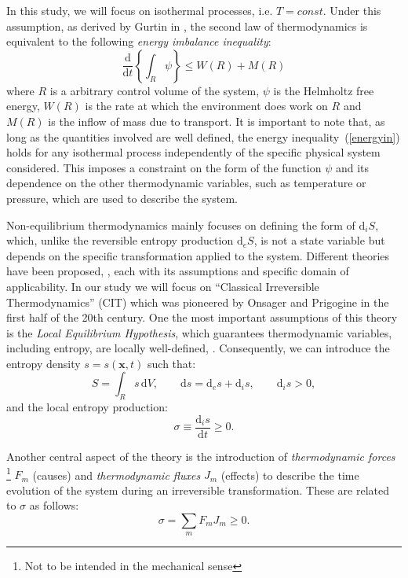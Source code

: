 \documentclass[runningheads]{llncs}
\renewcommand{\d}{\ensuremath{\text{d}}}
\begin{document}
In this study, we will focus on isothermal processes, i.e. $T=const$. Under this assumption, as derived by Gurtin in \cite{GURTIN}, the second law of thermodynamics is equivalent to the following \textit{energy imbalance inequality}:
\begin{equation}
\frac{\d}{\d t} \left\{\int_R \psi \right\}\leq W(R) + M(R) \label{energyin}
\end{equation}
where $R$ is a arbitrary control volume of the system, $\psi$ is the Helmholtz free energy, $W(R)$ is the rate at which the environment does work on $R$ and $M(R)$ is the inflow of mass due to transport. It is important to note that, as long as the quantities involved are well defined, the energy inequality~(\ref{energyin}) holds for any isothermal process independently of the specific physical system considered. This imposes a constraint on the form of the function $\psi$ and its dependence on the other thermodynamic variables, such as temperature or pressure, which are used to describe the system. 

Non-equilibrium thermodynamics mainly focuses on defining the form of $\d_i S$, which, unlike the reversible entropy production $\d_e S$, is not a state variable but depends on the specific transformation applied to the system. 
Different theories have been proposed, \cite{NET}, each with its assumptions and specific domain of applicability. In our study we will focus on \textquotedblleft Classical Irreversible Thermodynamics'' (CIT) which was pioneered by Onsager \cite{onsager} and Prigogine \cite{prigogine} in the first half of the 20th century. One the most important assumptions of this theory is the \textit{Local Equilibrium Hypothesis}, which guarantees thermodynamic variables, including entropy, are locally well-defined, \cite{NET}. 
Consequently, we can introduce the entropy density $s=s(\mathbf{x},t)$ such that:
\begin{equation}
S = \int_{R} s \,\d V, \qquad \d s = \d_e s + \d_is, \qquad \d_is > 0, 
\end{equation}
and the local entropy production:
\begin{equation}
\sigma \equiv \frac{\d_i s}{\d t} \geq 0.
\end{equation}

Another central aspect of the theory is the introduction of \textit{thermodynamic forces} \footnote{Not to be intended in the mechanical sense} $F_m$ (causes) and \textit{thermodynamic fluxes} $J_m$ (effects) to describe the time evolution of the system during an irreversible transformation. These are related to $\sigma$ as follows:
\begin{equation}
\sigma = \sum_m F_m J_m\geq 0.
\label{2law}
\end{equation}
\end{document}

